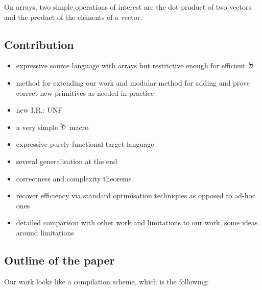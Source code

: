 
On arrays, two simple operations of interest are the dot-product of two vectors and the product of the elements of a vector.

\subsection{Contribution}

\begin{itemize}
    \item expressive source language with arrays but restrictive enough for efficient $\Dsynrevsymbol$
    \item method for extending our work and modular method for adding and prove correct new primitives as needed in practice 
    \item new I.R.: UNF
    \item a very simple $\Dsynrevsymbol$ macro
    \item expressive purely functional target language
    \item several generalisation at the end
    \item correctness and complexity theorems
    \item recover efficiency via standard optimisation techniques as opposed to ad-hoc ones
    \item detailed comparison with other work and limitations to our work, some ideas around limitations
\end{itemize}

\subsection{Outline of the paper}

Our work looks like a compilation scheme, which is the following:

